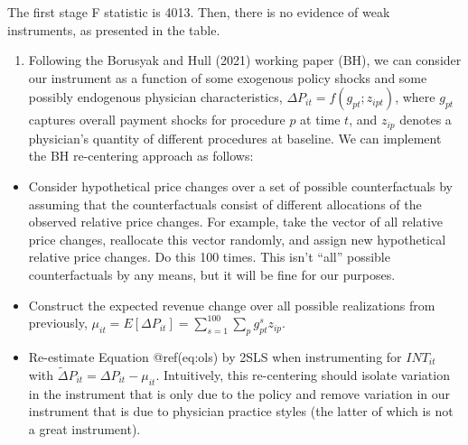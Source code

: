 \documentclass[
  12pt,
]{article}
\providecommand{\tightlist}{%
  \setlength{\itemsep}{0pt}\setlength{\parskip}{0pt}}
\begin{document}
The first stage F statistic is 4013. Then, there is no evidence of weak instruments, as presented in the table.

\begin{enumerate}
\def\labelenumi{\arabic{enumi}.}
\setcounter{enumi}{7}
\tightlist
\item
  Following the Borusyak and Hull (2021) working paper (BH), we can
  consider our instrument as a function of some exogenous policy shocks
  and some possibly endogenous physician characteristics,
  \(\Delta P_{it}=f\left(g_{pt}; z_{ipt}\right)\), where \(g_{pt}\)
  captures overall payment shocks for procedure \(p\) at time \(t\), and
  \(z_{ip}\) denotes a physician's quantity of different procedures at
  baseline. We can implement the BH re-centering approach as follows:
\end{enumerate}

\begin{itemize}
\tightlist
\item
  Consider hypothetical price changes over a set of possible
  counterfactuals by assuming that the counterfactuals consist of
  different allocations of the observed relative price changes. For
  example, take the vector of all relative price changes, reallocate
  this vector randomly, and assign new hypothetical relative price
  changes. Do this 100 times. This isn't ``all'' possible
  counterfactuals by any means, but it will be fine for our purposes.
\item
  Construct the expected revenue change over all possible realizations
  from previously,
  \(\mu_{it} = E [\Delta P_{it}]= \sum_{s=1}^{100} \sum_{p} g_{pt}^{s} z_{ip}\).
\item
  Re-estimate Equation @ref(eq:ols) by 2SLS when instrumenting for
  \(INT_{it}\) with
  \(\tilde{\Delta} P_{it} = \Delta P_{it} - \mu_{it}\). Intuitively,
  this re-centering should isolate variation in the instrument that is
  only due to the policy and remove variation in our instrument that is
  due to physician practice styles (the latter of which is not a great
  instrument).
\end{itemize}

\end{document}
